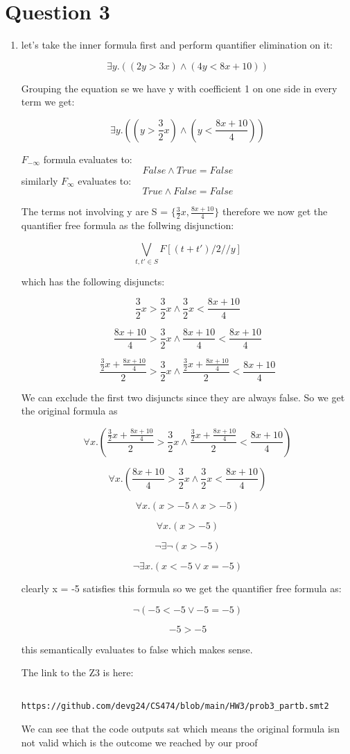 \documentclass{article}
\begin{document}
\section{Question 3}

\begin{enumerate}
    \item let's take the inner formula first and perform quantifier elimination on it:
    
    $$\exists y. ((2y > 3x) \land (4y < 8x + 10))$$

    Grouping the equation se we have y with coefficient 1 on one side in every term we get:

    $$\exists y. ((y > \frac{3}{2}x) \land (y < \frac{8x + 10}{4}))$$

    
    $F_{- \infty}$ formula evaluates to:
    $$False \land True = False$$
    similarly $F_{\infty }$ evaluates to:
    $$True \land False = False$$
    
    The terms not involving y are S = $\{\frac{3}{2}x, \frac{8x+10}{4} \}$
    therefore we now get the quantifier free formula as the follwing disjunction:

    $$\bigvee_{t,t' \in S} F[(t+t')/2//y]$$

    which has the following disjuncts:

    $$\frac{3}{2}x > \frac{3}{2}x \land \frac{3}{2}x < \frac{8x+10}{4}$$

    $$\frac{8x+10}{4} > \frac{3}{2}x \land \frac{8x+10}{4} < \frac{8x+10}{4}$$

    $$\frac{\frac{3}{2}x + \frac{8x+10}{4}}{2} > \frac{3}{2}x \land \frac{\frac{3}{2}x + \frac{8x+10}{4}}{2} < \frac{8x+10}{4}$$

    We can exclude the first two disjuncts since they are always false. So we get the original formula as

    $$\forall x. (\frac{\frac{3}{2}x + \frac{8x+10}{4}}{2} > \frac{3}{2}x \land \frac{\frac{3}{2}x + \frac{8x+10}{4}}{2} < \frac{8x+10}{4})$$

    $$\forall x. (\frac{8x+10}{4} > \frac{3}{2}x \land \frac{3}{2}x < \frac{8x+10}{4})$$

    $$\forall x. (x > -5 \land x > -5)$$

    $$\forall x. (x > -5)$$

    $$\neg \exists \neg (x > -5)$$

    $$\neg \exists x. (x < -5 \lor x = -5)$$

    clearly x = -5 satisfies this formula so we get the quantifier free formula as:

    $$\neg (-5 < -5 \lor -5 = -5)$$

    $$-5 > -5$$

    this semantically evaluates to false which makes sense.

    The link to the Z3 is here: \begin{verbatim}
        https://github.com/devg24/CS474/blob/main/HW3/prob3_partb.smt2
    \end{verbatim}

    We can see that the code outputs sat which means the original formula isn not valid which is the outcome we reached by our proof

\end{enumerate}
\end{document}

